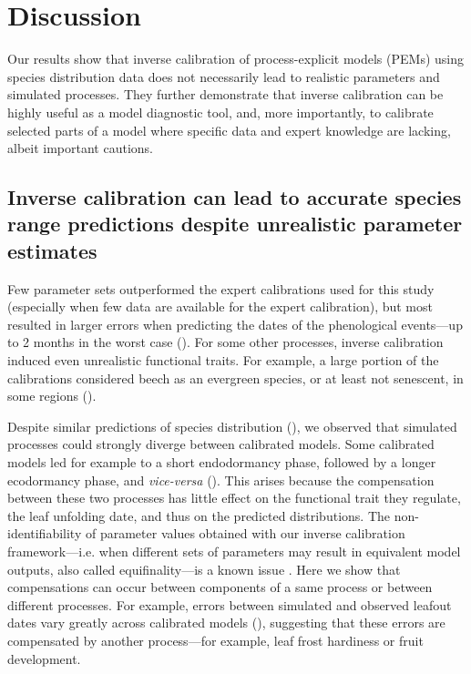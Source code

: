 \documentclass[preprint,12pt,authoryear]{elsarticle}
\begin{document}
{\section{Discussion}

Our results show that inverse calibration of process-explicit models (PEMs) using species distribution data does not necessarily lead to realistic parameters and simulated processes. They further demonstrate that inverse calibration can be highly useful as a model diagnostic tool, and, more importantly, to calibrate selected parts of a model where specific data and expert knowledge are lacking, albeit important cautions.

\subsection{Inverse calibration can lead to accurate species range predictions despite unrealistic parameter estimates}

Few parameter sets outperformed the expert calibrations used for this study (especially when few data are available for the expert calibration), but most resulted in larger errors when predicting the dates of the phenological events---up to 2 months in the worst case ().
For some other processes, inverse calibration induced even unrealistic functional traits. For example, a large portion of the calibrations considered beech as an evergreen species, or at least not senescent, in some regions ().

Despite similar predictions of species distribution (), we observed that simulated processes could strongly diverge between calibrated models. Some calibrated models led for example to a short endodormancy phase, followed by a longer ecodormancy phase, and \textit{vice-versa} (). This arises because the compensation between these two processes has little effect on the functional trait they regulate, the leaf unfolding date, and thus on the predicted distributions. The non-identifiability of parameter values obtained with our inverse calibration framework---i.e. when different sets of parameters may result in equivalent model outputs, also called equifinality---is a known issue \citep{He2017, Cameron2022, VanderMeersch2023, Malchow2024}. Here we show that compensations can occur between components of a same process or between different processes. For example, errors between simulated and observed leafout dates vary greatly across calibrated models (), suggesting that these errors are compensated by another process---for example, leaf frost hardiness or fruit development. 

}
\end{document}
